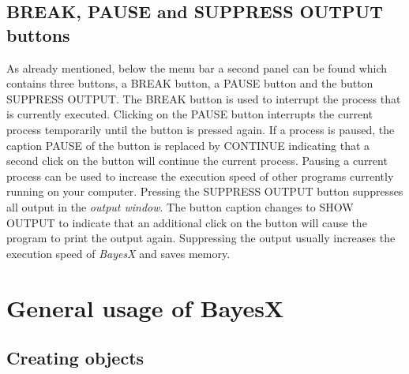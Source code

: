 \subsection{BREAK, PAUSE and SUPPRESS OUTPUT buttons}
    
 

As already mentioned, below the menu bar a second panel can be
found which contains three buttons, a BREAK button, a PAUSE button
and the button SUPPRESS OUTPUT. The BREAK button is used to
interrupt the process that is currently executed. Clicking on the
PAUSE button interrupts the current process temporarily until the
button is pressed again. If a process is paused, the caption PAUSE
of the button is replaced by CONTINUE indicating that a second
click on the button will continue the current process. Pausing a
current process can be used to increase the execution speed of
other programs currently running on your computer. Pressing the
SUPPRESS OUTPUT button suppresses all output in the {\em output window}.
The button caption changes to SHOW OUTPUT to indicate that an
additional click on the button will cause the  program to print
the output again. Suppressing the output usually increases the
execution speed of {\em BayesX} and saves memory.


\section{General usage of BayesX}
\label{generalusage}

\subsection{Creating objects}
\label{createobject}

